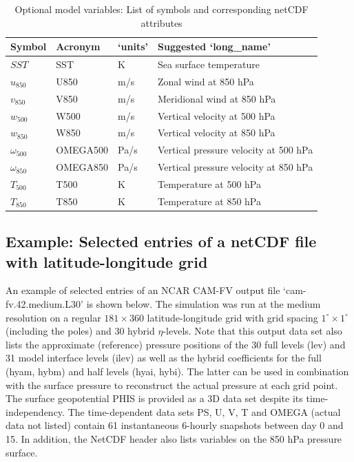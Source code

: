 \documentclass[times,doublespace]{fldauth}
\begin{document}
{\begin{appendix}
\begin{table}[h]
\caption{Optional model variables: List of symbols and corresponding netCDF attributes} \label{tab:netcdf_opt}
\begin{tabular*}{\textwidth}{@{\extracolsep{\fill}}llll}
\hline Symbol & Acronym & `units' & Suggested `long\_name'  \\ \hline 
$SST$ & SST & K & Sea surface temperature  \\
$u_{850}$ & U850 & m/s &  Zonal wind at 850 hPa   \\
$v_{850}$ & V850 & m/s & Meridional wind at 850 hPa  \\
$w_{500}$ & W500 &m/s &  Vertical velocity at 500 hPa   \\
$w_{850}$ & W850 &m/s &  Vertical velocity at 850 hPa   \\
$\omega_{500}$ & OMEGA500 & Pa/s &  Vertical pressure velocity at 500 hPa   \\
$\omega_{850}$ & OMEGA850 & Pa/s &  Vertical pressure velocity at 850 hPa   \\
$T_{500}$ & T500 & K & Temperature at 500 hPa  \\
$T_{850}$ & T850 & K & Temperature at 850 hPa  \\
\hline 
\end{tabular*}
\end{table}


\subsection{Example: Selected entries of a netCDF file with latitude-longitude grid}
\label{netcdf-example}
An example of selected entries of an NCAR CAM-FV output file `cam-fv.42.medium.L30'  is shown below. The simulation was run at the medium resolution on a regular $181 \times 360$ latitude-longitude grid with grid spacing $1^{\circ} \times 1^{\circ}$ (including the poles) and 30 hybrid $\eta$-levels. Note that this output data set also lists the approximate (reference) pressure positions of the 30 full levels (lev) and 31 model interface levels (ilev) as well as the hybrid coefficients for the full (hyam, hybm) and half levels (hyai, hybi). The latter can be used in combination with the surface pressure to reconstruct the actual pressure at each grid point. The surface geopotential PHIS is provided as a 3D data set despite its time-independency. The time-dependent data sets PS, U, V, T and OMEGA (actual data not listed) contain 61 instantaneous 6-hourly snapshots between day 0 and 15. In addition, the NetCDF header also lists variables on the 850 hPa pressure surface.


\end{appendix}}
\end{document}
